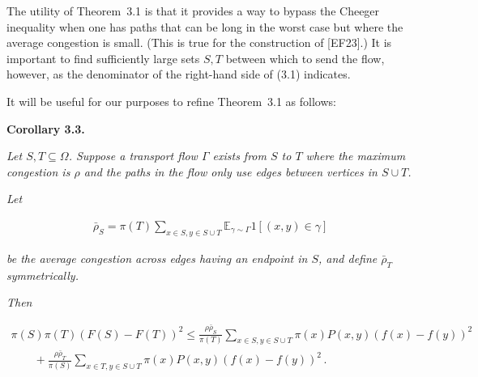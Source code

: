 \documentclass[10pt,a4paper]{article}
\begin{document}
The utility of Theorem 3.1 is that it provides a way to bypass the Cheeger inequality when one has paths that can be long in the worst case but where the average congestion is small. (This is true for the construction of [EF23].) It is important to find sufficiently large sets $S,T$ between which to send the flow, however, as the denominator of the right-hand side of (3.1) indicates.\par




It will be useful for our purposes to refine Theorem 3.1 as follows:\par





\par\medskip\noindent\textbf{\textbf{Corollary 3.3}\textbf{.}}\par



\emph{Let $S,T\subseteq\Omega$. Suppose a transport flow $\Gamma$ exists from $S$ to $T$ where the maximum congestion is $\rho$ and the paths in the flow only use edges between vertices in $S\cup T$.}\par




\emph{Let}\par


\[\begin{gathered}
\bar{\rho}_{S}=\pi(T)\sum_{x\in S,y\in S\cup T}\mathbb{E}_{\gamma\sim\Gamma}1[(x,y)\in\gamma]
\end{gathered}\]


\emph{be the average congestion across edges having an endpoint in $S$, and define $\bar{\rho}_{T}$ symmetrically.}\par




\emph{Then}\par


\[\begin{gathered}
\displaystyle\pi(S)\pi(T)(F(S)-F(T))^{2} \displaystyle\leq\frac{\rho\bar{\rho}_{S}}{\pi(T)}\sum_{x\in S,y\in S\cup T}\pi(x)P(x,y)(f(x)-f(y))^{2} \\
\displaystyle\quad\quad+\frac{\rho\bar{\rho}_{T}}{\pi(S)}\sum_{x\in T,y\in S\cup T}\pi(x)P(x,y)(f(x)-f(y))^{2}\,.
\end{gathered}\]



\end{document}
